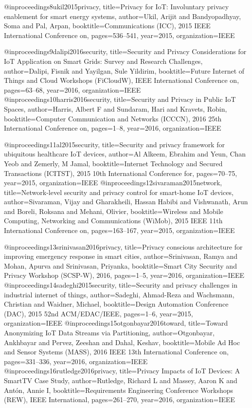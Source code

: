 {{{{{{@inproceedings{8ukil2015privacy,
  title={Privacy for {I}o{T}: Involuntary privacy enablement for smart energy systems},
  author={Ukil, Arijit and Bandyopadhyay, Soma and Pal, Arpan},
  booktitle={Communications (ICC), 2015 IEEE International Conference on},
  pages={536--541},
  year={2015},
  organization={IEEE}
}

@inproceedings{9dalipi2016security,
  title={Security and Privacy Considerations for {I}o{T} Application on Smart Grids: Survey and Research Challenges},
  author={Dalipi, Fisnik and Yayilgan, Sule Yildirim},
  booktitle={Future Internet of Things and Cloud Workshops (FiCloudW), IEEE International Conference on},
  pages={63--68},
  year={2016},
  organization={IEEE}
}
@inproceedings{10harris2016security,
  title={Security and Privacy in Public {I}o{T} Spaces},
  author={Harris, Albert F and Sundaram, Hari and Kravets, Robin},
  booktitle={Computer Communication and Networks (ICCCN), 2016 25th International Conference on},
  pages={1--8},
  year={2016},
  organization={IEEE}
}

@inproceedings{11al2015security,
  title={Security and privacy framework for ubiquitous healthcare {I}o{T} devices},
  author={Al Alkeem, Ebrahim and Yeun, Chan Yeob and Zemerly, M Jamal},
  booktitle={Internet Technology and Secured Transactions (ICITST), 2015 10th International Conference for},
  pages={70--75},
  year={2015},
  organization={IEEE}
}
@inproceedings{12sivaraman2015network,
  title={Network-level security and privacy control for smart-home {I}o{T} devices},
  author={Sivaraman, Vijay and Gharakheili, Hassan Habibi and Vishwanath, Arun and Boreli, Roksana and Mehani, Olivier},
  booktitle={Wireless and Mobile Computing, Networking and Communications (WiMob), 2015 IEEE 11th International Conference on},
  pages={163--167},
  year={2015},
  organization={IEEE}
}

@inproceedings{13srinivasan2016privacy,
  title={Privacy conscious architecture for improving emergency response in smart cities},
  author={Srinivasan, Ramya and Mohan, Apurva and Srinivasan, Priyanka},
  booktitle={Smart City Security and Privacy Workshop (SCSP-W), 2016},
  pages={1--5},
  year={2016},
  organization={IEEE}
}
@inproceedings{14sadeghi2015security,
  title={Security and privacy challenges in industrial internet of things},
  author={Sadeghi, Ahmad-Reza and Wachsmann, Christian and Waidner, Michael},
  booktitle={Design Automation Conference (DAC), 2015 52nd ACM/EDAC/IEEE},
  pages={1--6},
  year={2015},
  organization={IEEE}
}
@inproceedings{15otgonbayar2016toward,
  title={Toward Anonymizing {I}o{T} Data Streams via Partitioning},
  author={Otgonbayar, Ankhbayar and Pervez, Zeeshan and Dahal, Keshav},
  booktitle={Mobile Ad Hoc and Sensor Systems (MASS), 2016 IEEE 13th International Conference on},
  pages={331--336},
  year={2016},
  organization={IEEE}
}
@inproceedings{16rutledge2016privacy,
  title={Privacy Impacts of {I}o{T} Devices: A SmartTV Case Study},
  author={Rutledge, Richard L and Massey, Aaron K and Ant{\'o}n, Annie I},
  booktitle={Requirements Engineering Conference Workshops (REW), IEEE International},
  pages={261--270},
  year={2016},
  organization={IEEE}
}

}}}}}}
